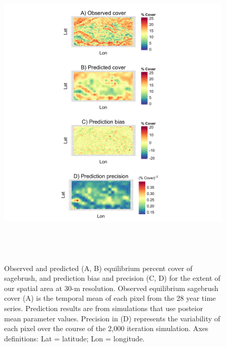 \documentclass[12pt,]{article}
\begin{document}
\begin{figure}[!ht]
  \centering
      \includegraphics[height=6in]{../figures/obs_pred_spatial_subset.png}
  \caption{Observed and predicted (A, B) equilibrium percent cover of sagebrush, and prediction bias and precision (C, D) for the extent of our spatial area at 30-m resolution. Observed equilibrium sagebrush cover (A) is the temporal mean of each pixel from the 28 year time series. Prediction results are from simulations that use posteior mean parameter values. Precision in (D) represents the variability of each pixel over the course of the 2,000 iteration simulation. Axes definitions: Lat = latitude; Lon = longitude.}
\end{figure}

\newpage{}
\end{document}
